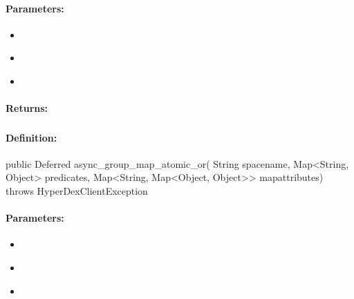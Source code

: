 \paragraph{Parameters:}
\begin{itemize}[noitemsep]
\item {}\\

\item {}\\

\item {}\\

\end{itemize}

\paragraph{Returns:}


\pagebreak
\subsubsection{}
\label{api:java:async_group_map_atomic_or}


\paragraph{Definition:}
\begin{javacode}
public Deferred async_group_map_atomic_or(
        String spacename,
        Map<String, Object> predicates,
        Map<String, Map<Object, Object>> mapattributes) throws HyperDexClientException
\end{javacode}

\paragraph{Parameters:}
\begin{itemize}[noitemsep]
\item {}\\

\item {}\\

\item {}\\

\end{itemize}

